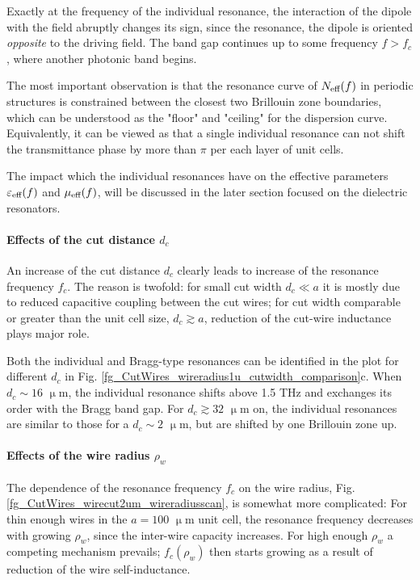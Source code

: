 Exactly at the frequency of the individual resonance, the interaction of the dipole with the field abruptly changes its sign, since the resonance, the dipole is oriented \textit{opposite} to the driving field. The band gap continues up to some frequency $f > f_c$, where another photonic band begins. 

The most important observation is that the resonance curve of $N_{\text{eff} }(f)$ in periodic structures is constrained between the closest two Brillouin zone boundaries, which can be understood as the "floor" and "ceiling" for the dispersion curve. Equivalently, it can be viewed as that a single individual resonance can not shift the transmittance phase by more than $\pi$ per each layer of unit cells. 

The impact which the individual resonances  have on the effective parameters $\varepsilon_{\text{eff} }(f)$ and $\mu_{\text{eff} }(f)$, will be discussed in the later section focused on the dielectric resonators.

\paragraph{Effects of the cut distance $d_c$}
An increase of the cut distance $d_c$ clearly leads to increase of the resonance frequency $f_c$. The reason is twofold: for small cut width $d_c\ll a$ it is mostly due to reduced capacitive coupling between the cut wires; for cut width comparable or greater than the unit cell size, $d_c \gtrsim a$, reduction of the cut-wire inductance plays major role.

Both the individual and Bragg-type resonances can be identified in the plot for different $d_c$ in Fig. \ref{fg_CutWires_wireradius1u_cutwidth_comparison}c. When $d_c \sim 16$  $\upmu$m, the individual resonance shifts above 1.5 THz and exchanges its order with the Bragg band gap. 
For $d_c \gtrsim 32$  $\upmu$m on, the individual resonances are similar to those for a $d_c\sim 2$ $\upmu$m, but are shifted by one Brillouin zone up.

\paragraph{Effects of the wire radius $\rho_w$}
The dependence of the resonance frequency $f_c$ on the wire radius, Fig. \ref{fg_CutWires_wirecut2um_wireradiusscan}, is somewhat more complicated: For thin enough wires in the $a=100$ $\upmu$m unit cell, the resonance frequency decreases with growing $\rho_w$, since the inter-wire capacity increases. 
For high enough $\rho_w$ a competing mechanism prevails; $f_c(\rho_w)$ then starts growing as a result of reduction of the wire self-inductance.

